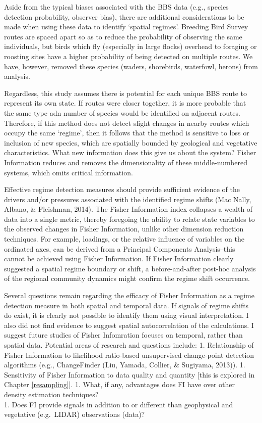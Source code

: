\documentclass[12pt,twoside,openany]{reedthesis}
\begin{document}
Aside from the typical biases associated with the BBS data (e.g.,
species detection probability, observer bias), there are additional
considerations to be made when using these data to identify `spatial
regimes'. Breeding Bird Survey routes are spaced apart so as to reduce
the probability of observing the same individuals, but birds which fly
(especially in large flocks) overhead to foraging or roosting sites have
a higher probability of being detected on multiple routes. We have,
however, removed these species (waders, shorebirds, waterfowl, herons)
from analysis.

Regardless, this study assumes there is potential for each unique BBS
route to represent its own state. If routes were closer together, it is
more probable that the same type adn number of species would be
identified on adjacent routes. Therefore, if this method does not detect
slight changes in nearby routes which occupy the same `regime', then it
follows that the method is sensitive to loss or inclusion of new
species, which are spatially bounded by geological and vegetative
characteristics. What new information does this give us about the
system? Fisher Information reduces and removes the dimensionality of
these middle-numbered systems, which omits critical information.

Effective regime detection measures should provide sufficient evidence
of the drivers and/or pressures associated with the identified regime
shifts (Mac Nally, Albano, \& Fleishman, 2014). The Fisher Information
index collapses a wealth of data into a single metric, thereby foregoing
the ability to relate state variables to the observed changes in Fisher
Information, unlike other dimension reduction techniques. For example,
loadings, or the relative influence of variables on the ordinated axes,
can be derived from a Principal Components Analysis--this cannot be
achieved using Fisher Information. If Fisher Information clearly
suggested a spatial regime boundary or shift, a before-and-after
post-hoc analysis of the regional community dynamics might confirm the
regime shift occurrence.

Several questions remain regarding the efficacy of Fisher Information as
a regime detection measure in both spatial and temporal data. If signals
of regime shifts do exist, it is clearly not possible to identify them
using visual interpretation. I also did not find evidence to suggest
spatial autocorrelation of the calculations. I suggest future studies of
Fisher Infomration focuses on temporal, rather than spatial data.
Potential areas of research and questions include: 1. Relationship of
Fisher Information to likelihood ratio-based unsupervised change-point
detection algorithms (e.g., ChangeFinder (Liu, Yamada, Collier, \&
Sugiyama, 2013)). 1. Sensitivity of Fisher Information to data quality
and quantity {[}this is explored in Chapter \ref{resampling}{]}. 1.
What, if any, advantages does FI have over other density estimation
techniques?\\
1. Does FI provide signals in addition to or different than geophysical
and vegetative (e.g.~LIDAR) observations (data)?
\end{document}
